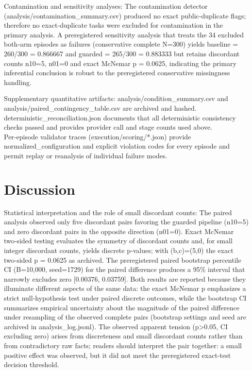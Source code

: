 \documentclass[conference]{IEEEtran}
\begin{document}
Contamination and sensitivity analyses: The contamination detector (analysis/contamination\_summary.csv) produced no exact public‑duplicate flags; therefore no exact‑duplicate tasks were excluded for contamination in the primary analysis. A preregistered sensitivity analysis that treats the 34 excluded both‑arm episodes as failures (conservative complete N=300) yields baseline = 260/300 = 0.866667 and guarded = 265/300 = 0.883333 but retains discordant counts n10=5, n01=0 and exact McNemar p = 0.0625, indicating the primary inferential conclusion is robust to the preregistered conservative missingness handling.

Supplementary quantitative artifacts: analysis/condition\_summary.csv and analysis/paired\_contingency\_table.csv are archived and hashed. deterministic\_reconciliation.json documents that all deterministic consistency checks passed and provides provider call and stage counts used above. Per‑episode validator traces (execution/scoring/*.json) provide normalized\_configuration and explicit violation codes for every episode and permit replay or reanalysis of individual failure modes.

\section{Discussion}
Statistical interpretation and the role of small discordant counts: The paired analysis observed only five discordant pairs favoring the guarded pipeline (n10=5) and zero discordant pairs in the opposite direction (n01=0). Exact McNemar two‑sided testing evaluates the symmetry of discordant counts and, for small integer discordant counts, yields discrete p‑values; with (b,c)=(5,0) the exact two‑sided p = 0.0625 as archived. The preregistered paired bootstrap percentile CI (B=10,000, seed=1729) for the paired difference produces a 95\% interval that narrowly excludes zero [0.00376, 0.03759]. Both results are reported because they illuminate different aspects of the same data: the exact McNemar p emphasizes a strict null‑hypothesis test under paired discrete outcomes, while the bootstrap CI summarizes empirical uncertainty about the magnitude of the paired difference under resampling of the observed complete pairs (bootstrap settings and seed are archived in analysis\_log.jsonl). The observed apparent tension (p>0.05, CI excluding zero) arises from discreteness and small discordant counts rather than from contradictory raw facts; readers should interpret the pair together: a small positive effect was observed, but it did not meet the preregistered exact‑test decision threshold.
\end{document}
